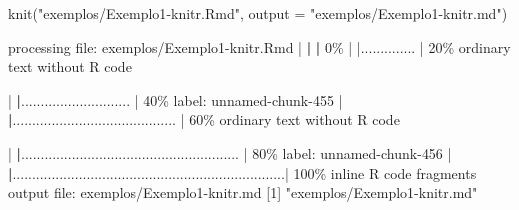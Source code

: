 \documentclass[
  10pt,
  a4paper]{book}
\newenvironment{Shaded}{\begin{snugshade}}{\end{snugshade}}
\newcommand{\AttributeTok}[1]{\textcolor[rgb]{0.77,0.63,0.00}{#1}}
\newcommand{\DecValTok}[1]{\textcolor[rgb]{0.00,0.00,0.81}{#1}}
\newcommand{\ErrorTok}[1]{\textcolor[rgb]{0.64,0.00,0.00}{\textbf{#1}}}
\newcommand{\FunctionTok}[1]{\textcolor[rgb]{0.00,0.00,0.00}{#1}}
\newcommand{\NormalTok}[1]{#1}
\newcommand{\SpecialCharTok}[1]{\textcolor[rgb]{0.00,0.00,0.00}{#1}}
\newcommand{\StringTok}[1]{\textcolor[rgb]{0.31,0.60,0.02}{#1}}
\begin{document}
\begin{Shaded}
\begin{Highlighting}[]
\FunctionTok{knit}\NormalTok{(}\StringTok{"exemplos/Exemplo1{-}knitr.Rmd"}\NormalTok{, }\AttributeTok{output =} \StringTok{"exemplos/Exemplo1{-}knitr.md"}\NormalTok{)}


\NormalTok{processing file}\SpecialCharTok{:}\NormalTok{ exemplos}\SpecialCharTok{/}\NormalTok{Exemplo1}\SpecialCharTok{{-}}\NormalTok{knitr.Rmd}
  \SpecialCharTok{|}                                                                              \ErrorTok{|}                                                                      \ErrorTok{|}   \DecValTok{0}\SpecialCharTok{\%  |                                                                              |..............                                                        |  20\%}
\NormalTok{  ordinary text without R code}

  \SpecialCharTok{|}                                                                              \ErrorTok{|}\NormalTok{............................                                          }\SpecialCharTok{|}  \DecValTok{40}\NormalTok{\%}
\NormalTok{label}\SpecialCharTok{:}\NormalTok{ unnamed}\SpecialCharTok{{-}}\NormalTok{chunk}\DecValTok{{-}455}
  \SpecialCharTok{|}                                                                              \ErrorTok{|}\NormalTok{..........................................                            }\SpecialCharTok{|}  \DecValTok{60}\NormalTok{\%}
\NormalTok{  ordinary text without R code}

  \SpecialCharTok{|}                                                                              \ErrorTok{|}\NormalTok{........................................................              }\SpecialCharTok{|}  \DecValTok{80}\NormalTok{\%}
\NormalTok{label}\SpecialCharTok{:}\NormalTok{ unnamed}\SpecialCharTok{{-}}\NormalTok{chunk}\DecValTok{{-}456}
  \SpecialCharTok{|}                                                                              \ErrorTok{|}\NormalTok{......................................................................}\SpecialCharTok{|} \DecValTok{100}\NormalTok{\%}
\NormalTok{   inline R code fragments}
\NormalTok{output file}\SpecialCharTok{:}\NormalTok{ exemplos}\SpecialCharTok{/}\NormalTok{Exemplo1}\SpecialCharTok{{-}}\NormalTok{knitr.md}
\NormalTok{[}\DecValTok{1}\NormalTok{] }\StringTok{"exemplos/Exemplo1{-}knitr.md"}
\end{Highlighting}
\end{Shaded}
\end{document}
